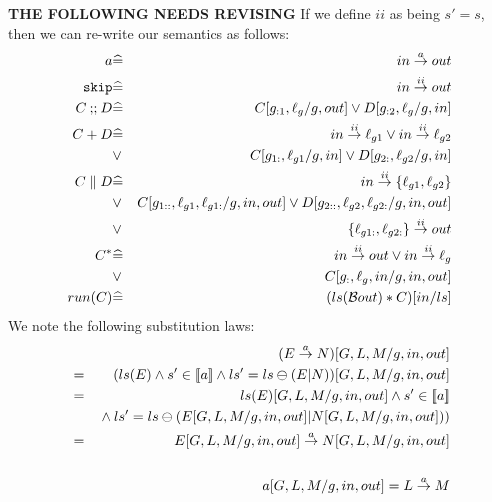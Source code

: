 \textbf{THE FOLLOWING NEEDS REVISING}
If we define $ii$ as being  $s'=s$,
then we can re-write our semantics as follows:
\begin{eqnarray*}
   a
   &\widehat=&
   in \stackrel{a}{\rightarrow} out
\\ \texttt{skip}
   &\widehat=&
   in \stackrel{ii}{\rightarrow} out
\\ C \mathbin{;\!;} D
   &\widehat=&
   C[g_{:1},\ell_g/g,out] \lor D[g_{:2},\ell_g/g,in]
\\ C + D
   &\widehat=&
   in \stackrel{ii}{\rightarrow} \ell_{g1} \lor in \stackrel{ii}{\rightarrow} \ell_{g2}
\\ &\lor&
   C[g_{1:},\ell_{g1}/g,in] \lor D[g_{2:},\ell_{g2}/g,in]
\\ C \parallel D
   &\widehat=&
   in \stackrel{ii}{\rightarrow} \{\ell_{g1},\ell_{g2}\}
\\ &\lor&
   C[g_{1::},\ell_{g1},\ell_{g1:}/g,in,out]
   \lor D[g_{2::},\ell_{g2},\ell_{g2:}/g,in,out]
\\ &\lor&
   \{\ell_{g1:},\ell_{g2:}\}
   \stackrel{ii}{\rightarrow}
   out
\\ C^*
   &\widehat=&
   in \stackrel{ii}{\rightarrow} out
   \lor
   in \stackrel{ii}{\rightarrow} \ell_g
\\ &\lor&
   C[g_{:},\ell_g,in/g,in,out]
\\ run(C)
   &\widehat=&
   ( ls(\mathcal{B}{out}) * C)[in/ls]
\end{eqnarray*}
We note the following substitution laws:
\begin{eqnarray*}
  && (E \stackrel{a}{\rightarrow} N)[G,L,M/g,in,out]
\\&=& (ls(E) \land s' \in [\![{a}]\!] \land ls'=ls\ominus(E|N))[G,L,M/g,in,out]
\\&=& ls(E)[G,L,M/g,in,out]
       \land s' \in [\![{a}]\!]
\\&& {}\land ls'=ls\ominus(E[G,L,M/g,in,out]|N[G,L,M/g,in,out]))
\\&=& E[G,L,M/g,in,out] \stackrel{a}{\rightarrow} N[G,L,M/g,in,out]
\\
\\&& a[G,L,M/g,in,out] = L \stackrel{a}{\rightarrow} M
\end{eqnarray*}

